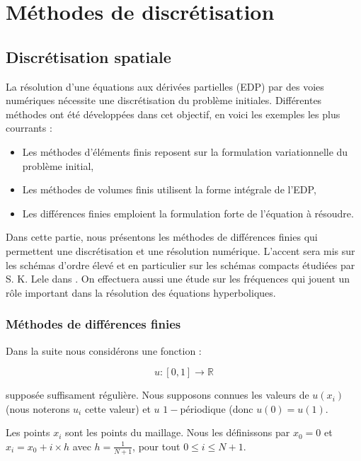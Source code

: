 
\chapter{Méthodes de discrétisation}

\section{Discrétisation spatiale}

La résolution d'une équations aux dérivées partielles (EDP) par des
voies numériques nécessite une discrétisation du problème
initiales. Différentes méthodes ont été développées dans cet objectif,
en voici les exemples les plus courrants :

\begin{itemize}
\item Les méthodes d'éléments finis reposent sur la formulation
  variationnelle du problème initial,

\item Les méthodes de volumes finis utilisent la forme intégrale de
  l'EDP,

\item Les différences finies emploient la formulation forte de
  l'équation à résoudre.
\end{itemize}

Dans cette partie, nous présentons les méthodes de différences finies
qui permettent une discrétisation et une résolution
numérique. L'accent sera mis sur les schémas d'ordre élevé \cite{Desquesnes2007} et en
particulier sur les schémas compacts étudiées par S. K. Lele dans
\cite{Lele1991}. On effectuera aussi une étude sur les fréquences qui
jouent un r\^ole important dans la résolution des équations hyperboliques. 

\subsection{Méthodes de différences finies}

Dans la suite nous considérons une fonction :

$$u : [0, 1] \rightarrow \mathbb{R}$$

 supposée suffisament régulière. Nous supposons connues les valeurs de $u(x_i)$
(nous noterons $u_i$ cette valeur) et $u$ $1-$périodique (donc $u(0) =
 u(1)$.

Les points $x_i$ sont les points du maillage. Nous les définissons par
$x_0 = 0$ et $x_i = x_0 + i \times h$ avec $h = \frac{1}{N+1}$, pour
tout $ 0 \leq i \leq N+1 $.


